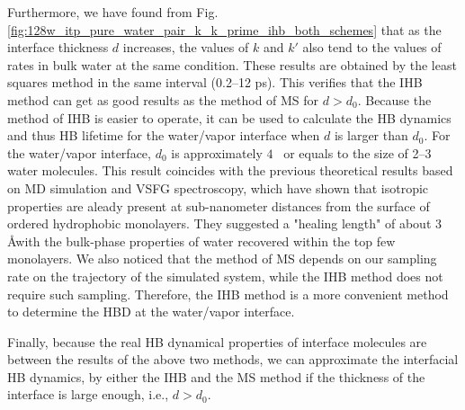 Furthermore, we have found from Fig.\thinspace\ref{fig:128w_itp_pure_water_pair_k_k_prime_ihb_both_schemes} that as the interface thickness $d$ increases, 
the values of $k$ and $k'$ also tend to the values of rates in bulk water at the same condition.
These results are obtained by the least squares method in the same interval (0.2--12 ps). This verifies that the IHB method 
can get as good results as the method of MS for $d>d_0$. 
Because the method of IHB is easier to operate, it can be used to calculate the HB dynamics and thus HB lifetime for the water/vapor interface 
when $d$ is larger than $d_0$. For the water/vapor interface, $d_0$ is approximately $4$ \A \ or equals to the size of 2--3 water molecules. This result coincides with the previous theoretical results based on MD simulation\cite{Townsend1985,Taylor1996,Morita2000} and VSFG spectroscopy\cite{Stiopkin2011,Tyrode2013},
which have shown that isotropic properties are aleady present
at sub-nanometer distances from the surface of ordered hydrophobic monolayers.
They suggested a "healing length" of about 3 \AA with the bulk-phase properties of water recovered within the top few monolayers.
We also noticed that the method of MS depends on our sampling rate on the trajectory of the simulated system, 
while the IHB method does not require such sampling. Therefore, the IHB method is a more convenient method to determine the HBD at the water/vapor interface.

Finally, because the real HB dynamical properties of interface molecules are between the results of the above two methods, 
we can approximate the interfacial HB dynamics, by either the IHB and the MS method if the thickness of the interface is large enough, i.e., $d>d_0$.


